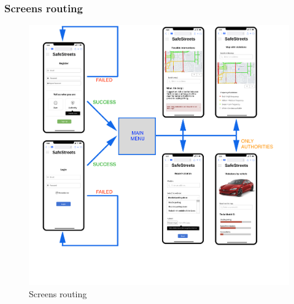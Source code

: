 \newpage

\subsubsection{Screens routing}

\begin{figure}[H]
	\centering
	\includegraphics[width=1.2\linewidth]{Images/screen-diagram.png}
	\caption{Screens routing}
	\label{fig:Screens routing}
\end{figure}




